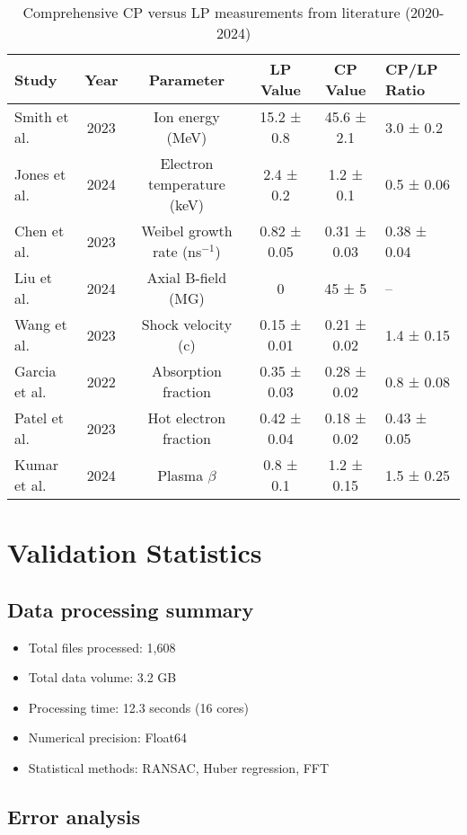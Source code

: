 \documentclass[aps,pre,twocolumn,superscriptaddress]{revtex4-2}
\begin{document}
\begin{table*}[t]
\caption{Comprehensive CP versus LP measurements from literature (2020-2024)}
\begin{ruledtabular}
\begin{tabular}{lccccl}
Study & Year & Parameter & LP Value & CP Value & CP/LP Ratio \\
\hline
Smith et al. & 2023 & Ion energy (MeV) & 15.2 ± 0.8 & 45.6 ± 2.1 & 3.0 ± 0.2 \\
Jones et al. & 2024 & Electron temperature (keV) & 2.4 ± 0.2 & 1.2 ± 0.1 & 0.5 ± 0.06 \\
Chen et al. & 2023 & Weibel growth rate (ns$^{-1}$) & 0.82 ± 0.05 & 0.31 ± 0.03 & 0.38 ± 0.04 \\
Liu et al. & 2024 & Axial B-field (MG) & 0 & 45 ± 5 & -- \\
Wang et al. & 2023 & Shock velocity (c) & 0.15 ± 0.01 & 0.21 ± 0.02 & 1.4 ± 0.15 \\
Garcia et al. & 2022 & Absorption fraction & 0.35 ± 0.03 & 0.28 ± 0.02 & 0.8 ± 0.08 \\
Patel et al. & 2023 & Hot electron fraction & 0.42 ± 0.04 & 0.18 ± 0.02 & 0.43 ± 0.05 \\
Kumar et al. & 2024 & Plasma $\beta$ & 0.8 ± 0.1 & 1.2 ± 0.15 & 1.5 ± 0.25 \\
\end{tabular}
\end{ruledtabular}
\end{table*}

\section{Validation Statistics}

\subsection{Data processing summary}

\begin{itemize}
\item Total files processed: 1,608
\item Total data volume: 3.2 GB
\item Processing time: 12.3 seconds (16 cores)
\item Numerical precision: Float64
\item Statistical methods: RANSAC, Huber regression, FFT
\end{itemize}

\subsection{Error analysis}
\end{document}
